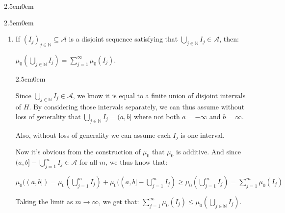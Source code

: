 \documentclass{book}
\newcommand{\hFour}{%
   \color{Cyan!80!black}
   \fontsize{12}{14}\selectfont%
}
\newenvironment{myIndent}{%
   \begin{adjustwidth}{2.5em}{0em}%
}{%
   \end{adjustwidth}%
}
\newcommand{\retTwo}{\hfill\bigbreak}
\begin{document}
\begin{myIndent}
\begin{myIndent}
\begin{enumerate}
\begin{myIndent}
            {\centering $\mu_0(I_i) = \sum\limits_{j=1}^n \mu_0(I_i \cap J_j)$ \retTwo\par}

            Similarly, we can show for each $J_j$ that:

            {\centering $\mu_0(J_j) = \sum\limits_{i=1}^m \mu_0(I_i \cap J_j)$ \retTwo\par}

            Thus: $\sum\limits_{i=1}^m \mu_0(I_i) = \sum\limits_{i=1}^m\sum\limits_{j=1}^n \mu_0(I_i \cap J_j) = \sum\limits_{j=1}^n \mu(J_j)$.\newpage
         \end{myIndent}

         \item If $(I_j)_{j \in \mathbb{N}} \subseteq \mathcal{A}$ is a disjoint sequence satisfying that $\bigcup\limits_{j\in\mathbb{N}}I_j \in \mathcal{A}$, then:\\ [-8pt]
         
         {\centering$\mu_0(\bigcup\limits_{j\in\mathbb{N}}I_j) = \sum\limits_{j=1}^\infty \mu_0(I_j)$.\retTwo\par}

         \begin{myIndent}\hFour
            Since $\bigcup\limits_{j\in\mathbb{N}}I_j \in \mathcal{A}$, we know it is equal to a finite union of disjoint intervals of $H$. By considering those intervals separately, we can thus assume without\\ [6pt] loss of generality that $\bigcup\limits_{j \in \mathbb{N}}I_j = (a, b]$ where not both $a = -\infty$ and $b = \infty$.\retTwo

            Also, without loss of generality we can assume each $I_j$ is one interval.\retTwo

            Now it's obvious from the construction of $\mu_0$ that $\mu_0$ is additive. And since $(a, b] - \bigcup\limits_{j=1}^m I_j \in \mathcal{A}$ for all $m$, we thus know that:\\ [-5pt]

            {\centering $\mu_0((a, b]) = \mu_0(\bigcup\limits_{j=1}^m I_j) + \mu_0((a, b] - \bigcup\limits_{j=1}^m I_j) \geq \mu_0(\bigcup\limits_{j=1}^m I_j) = \sum\limits_{j=1}^m \mu_0(I_j)$ \\\par}

            Taking the limit as $m \rightarrow \infty$, we get that: $\sum\limits_{j=1}^\infty \mu_0(I_j) \leq \mu_0(\bigcup\limits_{j\in \mathbb{N}} I_j)$.\\ [-6pt]
         \end{myIndent}
      \end{enumerate}
   \end{myIndent}
\end{myIndent}
\end{document}
